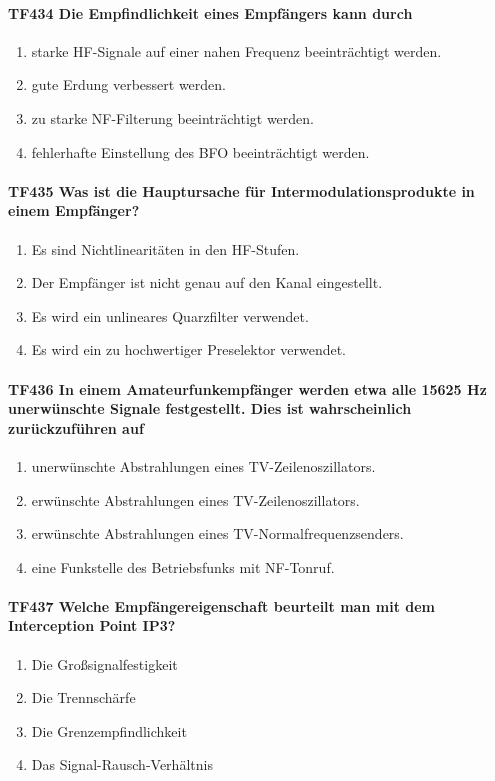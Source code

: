 \documentclass[8pt]{article}
\begin{document}
\paragraph*{TF434 Die Empfindlichkeit eines Empfängers kann durch}
\begin{enumerate}[nolistsep,label=\Alph*]
\item starke HF-Signale auf einer nahen Frequenz beeinträchtigt werden.
\item gute Erdung verbessert werden.
\item zu starke NF-Filterung beeinträchtigt werden.
\item fehlerhafte Einstellung des BFO beeinträchtigt werden.
\end{enumerate}

\paragraph*{TF435 Was ist die Hauptursache für Intermodulationsprodukte in einem Empfänger?}
\begin{enumerate}[nolistsep,label=\Alph*]
\item Es sind Nichtlinearitäten in den HF-Stufen.
\item Der Empfänger ist nicht genau auf den Kanal eingestellt.
\item Es wird ein unlineares Quarzfilter verwendet.
\item Es wird ein zu hochwertiger Preselektor verwendet.
\end{enumerate}

\paragraph*{TF436 In einem Amateurfunkempfänger werden etwa alle 15625 Hz unerwünschte Signale festgestellt. Dies ist wahrscheinlich zurückzuführen auf}
\begin{enumerate}[nolistsep,label=\Alph*]
\item unerwünschte Abstrahlungen eines TV-Zeilenoszillators.
\item erwünschte Abstrahlungen eines TV-Zeilenoszillators.
\item erwünschte Abstrahlungen eines TV-Normalfrequenzsenders.
\item eine Funkstelle des Betriebsfunks mit NF-Tonruf.
\end{enumerate}

\paragraph*{TF437 Welche Empfängereigenschaft beurteilt man mit dem Interception Point IP3?}
\begin{enumerate}[nolistsep,label=\Alph*]
\item Die Großsignalfestigkeit
\item Die Trennschärfe
\item Die Grenzempfindlichkeit
\item Das Signal-Rausch-Verhältnis
\end{enumerate}
\end{document}
